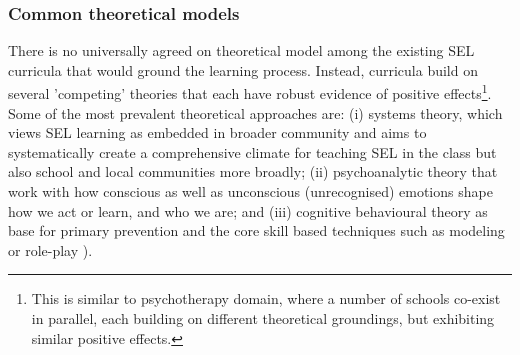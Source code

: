 \documentclass[prodmode,acmtochi]{acmsmall}
\newcommand{\qq}[2]{\textrm{\textit{``#2''}}{ [#1]}}
\begin{document}



\subsubsection{Common theoretical models}
There is no universally agreed on theoretical model among the existing SEL curricula \cite{Payton2000} that would ground the learning process. Instead, curricula build on several 'competing' theories that each have robust evidence of positive effects\footnote{This is similar to psychotherapy domain, where a number of schools co-exist in parallel, each building on different theoretical groundings, but exhibiting similar positive effects.}. 
Some of the most prevalent theoretical approaches are: (i) systems theory, which views SEL learning as embedded in broader community and aims to systematically create a comprehensive climate for teaching SEL in the class but also school and local communities more broadly; (ii) psychoanalytic theory that work with how conscious as well as unconscious (unrecognised) emotions shape how we act or learn, and who we are; and (iii) cognitive behavioural theory as base for primary prevention and the core skill based techniques such as modeling or role-play \cite[p.65]{Maree2007}). 
\end{document}
